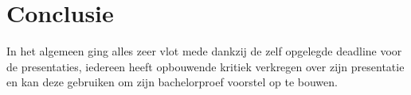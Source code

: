 \documentclass[fleqn,10pt]{voorstel}
\begin{document}
\section{Conclusie}
In het algemeen ging alles zeer vlot mede dankzij de zelf opgelegde deadline voor de presentaties, iedereen heeft opbouwende kritiek verkregen over zijn presentatie en kan deze gebruiken om zijn bachelorproef voorstel op te bouwen. 


\end{document}
